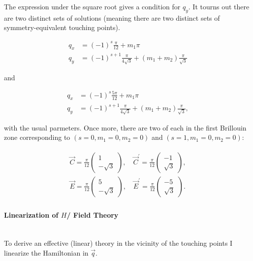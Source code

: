 \documentclass[../../../main.tex]{subfiles}
\begin{document}
The expression under the square root gives a condition for $q_y$. It tourns out there are two distinct sets of solutions (meaning there are two distinct sets of symmetry-equivalent touching points).

\begin{align}
	q_x &= (-1)^s \frac{\pi}{12} + m_1  \pi \\
	q_y &= (-1)^{s+1} \frac{\pi}{4\sqrt{3}} + (m_1+m_2)\frac{\pi}{\sqrt{3}}
\end{align}

and 

\begin{align}
	q_x &= (-1)^s\frac{5\pi}{12} + m_1 \pi \\
	q_y &= (-1)^{s+1}\frac{\pi}{4\sqrt{3}} + (m_1 + m_2)\frac{\pi}{\sqrt{3}},
\end{align}

with the usual parmeters. Once more, there are two of each in the first Brillouin zone corresponding to $(s = 0, m_1 = 0, m_2 = 0)$ and $(s = 1, m_1 = 0, m_2 = 0)$:

\begin{gather}
	\begin{split}
		\vec{C} = \frac{\pi}{12}
		\begin{pmatrix}
			1 \\
			-\sqrt{3}
		\end{pmatrix}, \quad 
		\vec{C}^\prime = \frac{\pi}{12}
		\begin{pmatrix}
			-1 \\
			\sqrt{3}
		\end{pmatrix},\\	
		\vec{E} = \frac{\pi}{12}
		\begin{pmatrix}
			5 \\
			-\sqrt{3}
		\end{pmatrix}, \quad
		\vec{E}^\prime = \frac{\pi}{12}
		\begin{pmatrix}
			-5 \\
			\sqrt{3}
		\end{pmatrix}.	
	\end{split}
\end{gather}

\paragraph{Linearization of $H$/ Field Theory} \hfill \\

To derive an effective (linear) theory in the vicinity of the touching points I linearize the Hamiltonian in $\vec{q}$.
\end{document}
